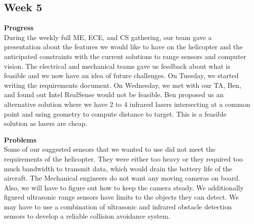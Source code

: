 \documentclass[onecolumn, oneside, letterpaper, draftclsnofoot, 10pt, compsoc]{IEEEtran}
\begin{document}
\subsection{Week 5}
\noindent \textbf{Progress}\\
During the weekly full ME, ECE, and CS gathering, our team gave a presentation about the features we would like to have on the helicopter and the anticipated constraints with the current solutions to range sensors and computer vision. The electrical and mechanical teams gave us feedback about what is feasible and we now have an idea of future challenges. On Tuesday, we started writing the requirements document. On Wednesday, we met with our TA, Ben, and found out Intel RealSense would not be feasible. Ben proposed us an alternative solution where we have 2 to 4 infrared lasers intersecting at a common point and using geometry to compute distance to target. This is a feasible solution as lasers are cheap.

\noindent \textbf{Problems}\\
Some of our suggested sensors that we wanted to use did not meet the requirements of the helicopter. They were either too heavy or they required too much bandwidth to transmit data, which would drain the battery life of the aircraft. The Mechanical engineers do not want any moving cameras on board. Also, we will have to figure out how to keep the camera steady. We additionally figured ultrasonic range sensors have limits to the objects they can detect. We may have to use a combination of ultrasonic and infrared obstacle detection sensors to develop a reliable collision avoidance system.
\end{document}
